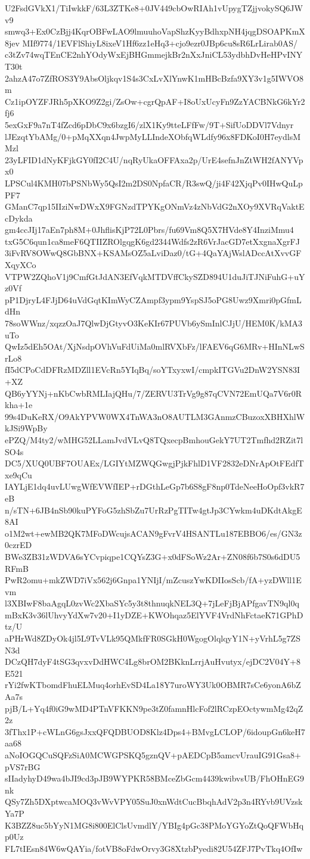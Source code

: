 U2FsdGVkX1/TiIwkkF/63L3ZTKe8+0JV449cbOwRIAh1vUpygTZjjvokySQ6JWv9
smwq3+Ex0CzBjj4KqrOBFwLAO9lmuuhoVapShzKyyBdhxpNH4jqgDSOAPKmX8jev
MIf9774/1EVFlShiyL8ixeV1Hf6zz1eHq3+cjo9ezr0JBp6cu8sR6LrLirab0AS/
c3tZv74wqTEnCE2nhYOdyWxEjBHGmmejkBr2nXxJniCL53ydbhDvHeHPvINYT30t
2ahzA47o7ZfROS3Y9AbsOljkqv1S4s3CxLvXlYnwK1mHBcBzfa9XY3v1g5IWVO8m
Cz1ipOYZFJRh5pXKO9Z2gi/ZsOw+cgrQpAF+I8oUxUcyFn9ZzYACBNkG6kYr2fj6
5exGxF9a7nT4fZcd6pDbC9x6bzgI6/zlX1Ky9tteLFfFw/9T+SifUoDDVl7Vdnyr
lJEzqtYbAMg/0+pMqXXqn4JwpMyLLIndeXObfqWLdfy96x8FDKoI0H7eydlsMMzl
23yLFID1dNyKFjkGY0fI2C4U/nqRyUkaOFFAxa2p/UrE4sefnJnZtWH2fANYVpx0
LPSCul4KMH07bPSNbWy5QsI2m2DS0NpfaCR/R3swQ/ji4F42XjqPv0IHwQuLpPF7
GManC7qp15IIziNwDWxX9FGNzdTPYKgONmVz4zNbVdG2nXOy9XVRqVaktEcDykda
gm4ccJIj17aEn7ph8M+0JhflisKjP72L0Pbrs/fu69Vm8Q5X7HVde8Y4InziMmu4
txG5C6qun1ca8meF6QTIIZROlgqgK6gd2344Wdfs2zR6VrJacGD7etXxgnaXgrFJ
3iFvRV8OWwQ8GbBNX+KSAMsOZ5aLviDaz0/tG+4QaYAjWslADccAtXvvGFXqyXCo
VTPW2ZQhoV1j9CmfGtJdAN3EfVqkMTDVffCkySZD894U1duJiTJNiFuhG+uYz0Vf
pP1DjryL4FJjD64uVdGqtKImWyCZAmpf3ypm9YspSJ5oPG8Uwz9Xmri0pGfmLdHn
78soWWnz/xqzzOaJ7QlwDjGtyvO3KeKIr67PUVb6ySmInlCJjU/HEM0K/kMA3uTo
QwIz5dEh5OAt/XjNsdpOVhVuFdUiMa0mlRVXbFz/lFAEV6qG6MRv+HInNLwSrLo8
fI5dCPoCdDFRzMDZll1EVcRn5YIqBq/soYTxyxwI/cmpkITGVu2DnW2YSN83I+XZ
QB6yYYNj+nKbCwbRMLIajQHu/7/ZERVU3TrVg9g87qCVN72EmUQa7V6r0Rkha+1e
99s4DuKeRX/O9AkYPVW0WX4TnWA3nO8AUTLM3GAnmzCBuzoxXBHXhlWkJSi9WpBy
ePZQ/M4ty2/wMHG52LLamJvdVLvQ8TQxecpBmhouGekY7UT2Tmfhd2RZit7lSO4s
DC5/XUQ0UBF7OUAEx/LGIYtMZWQGwgjPjkFhlD1VF2832eDNrApOtFEdfTxe9qCu
IAYLjE1dq4uvLUwgWfEVWfIEP+rDGthLeGp7b6S8gF8np0TdeNeeHoOpf3vkR7eB
n/sTN+6JB4nSb90kuPYFoG5zhSbZu7UrRzPgTITw4gtJp3CYwkm4uDKdtAkgE8AI
o1M2wt+ewMB2QK7MFoDWcujsACAN9gFvrV4HSANTLu187EBBO6/es/GN3z0czrED
BWe3ZB31zWDVA6sYCvpiqpe1CQYsZ3G+x0dFSoWz2Ar+ZN08f6b7S0s6dDU5RFmB
PwR2omu+mkZWD7iVx562j6Gnpa1YNIjI/mZcuszYwKDIIosScb/fA+yzDWll1Evm
l3XBIwF8baAgqL0zvWc2XbaSYc5y3t8thnuqkNEL3Q+7jLeFjBjAPfgavTN9ql0q
mBxK3v36lUhvyYdXw7v20+I1yDZE+KWOhqaz5ElYVF4VrdNhFctaeK71GPhDtz/U
aPHrWd8ZDyOk4jl5L9TvVLk95QMkfFR0SGkH0WgogOlqlqyY1N+yVrhL5g7ZSN3d
DCzQH7dyF4tSG3qvxvDdHWC4Lg8brOM2BKknLrrjAuHvutyx/ejDC2V04Y+8E521
rYi2fwKTbomdFhuELMuq4orhEvSD4La18Y7uroWY3Uk0OBMR7sCe6yonA6bZAa7s
pjB/L+Yq4f0iG9wMD4PTnVFKKN9pe3tZ0famnHlcFof2lRCzpEOctywmMg42qZ2z
3fThx1P+cWLnG6gsJxxQFQDBUOD8Klz4Dps4+BMvgLCLOP/6idoupGn6keH7aa68
aNoIOGQCuSQFzSiA0MCWGPSKQ5gznQV+pAEDCpB5amcvUrauIG91Gsa8+pVS7rBG
sIIadyhyD49wa4bJI9cd3pJB9WYPKR58BMceZbGcm4439kwibvsUB/FhOHnEG9nk
QSy7Zh5DXptwcaMOQ3vWvVPY05SuJ0xnWdtCucBbqhAdV2p3n4RYvb9UVzskYa7P
K3BZZ8uc5bYyN1MG8i800ElClsUvmdlY/YBIg4pGc38PMoYGYoZtQoQFWbHqp0Uz
FL7tIEsn84W6wQAYia/fotVB8oFdwOrvy3G8XtzbPyedi82U54ZFJ7PvTkq4OfIw

